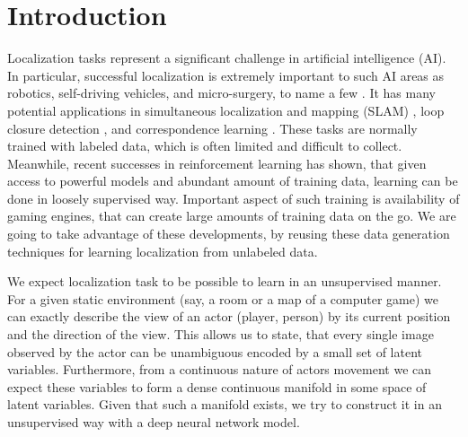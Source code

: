 
\chapter{Introduction}
\label{ch:intro}

%
%
%

Localization tasks represent a significant challenge in artificial intelligence (AI).
In particular, successful localization is extremely important to such AI areas as robotics, self-driving vehicles, and micro-surgery, to name a few \cite{Wang2017, Mountney2006}.
It has many potential applications in simultaneous localization and mapping (SLAM) \cite{Cadena2015, Zikos2016}, loop closure detection \cite{Xia2016, Gao2015a, Huang2016}, and correspondence learning \cite{Boscaini2016}.
These tasks are normally trained with labeled data, which is often limited and difficult to collect.
Meanwhile, recent successes in reinforcement learning \cite{Silver, Lample2016} has shown, that given access to powerful models and abundant amount of training data, learning can be done in loosely supervised way.
Important aspect of such training is availability of gaming engines, that can create large amounts of training data on the go.
We are going to take advantage of these developments, by reusing these data generation techniques for learning localization from unlabeled data.

We expect localization task to be possible to learn in an unsupervised manner.
For a given static environment (say, a room or a map of a computer game) we can exactly describe the view of an actor (player, person) by its current position and the direction of the view.
This allows us to state, that every single image observed by the actor can be unambiguous encoded by a small set of latent variables.
Furthermore, from a continuous nature of actors movement we can expect these variables to form a dense continuous manifold in some space of latent variables.
Given that such a manifold exists, we try to construct it in an unsupervised way with a deep neural network model.

